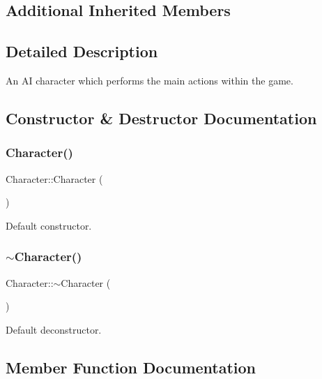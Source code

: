 \subsection*{Additional Inherited Members}


\subsection{Detailed Description}
An AI character which performs the main actions within the game. 

\subsection{Constructor \& Destructor Documentation}
\mbox{\label{class_character_adc27bdd255876169bad2ed0bae0cffb5}} 
\subsubsection{\texorpdfstring{Character()}{Character()}}
{\footnotesize\ttfamily Character\+::\+Character (\begin{DoxyParamCaption}{ }\end{DoxyParamCaption})}



Default constructor. 

\mbox{\label{class_character_a9e9be564d05ded80962b2045aa70b3fc}} 
\subsubsection{\texorpdfstring{$\sim$\+Character()}{~Character()}}
{\footnotesize\ttfamily Character\+::$\sim$\+Character (\begin{DoxyParamCaption}{ }\end{DoxyParamCaption})}



Default deconstructor. 



\subsection{Member Function Documentation}
\mbox{\label{class_character_a3f46233c0f715380c50469b9a875cb48}} 
